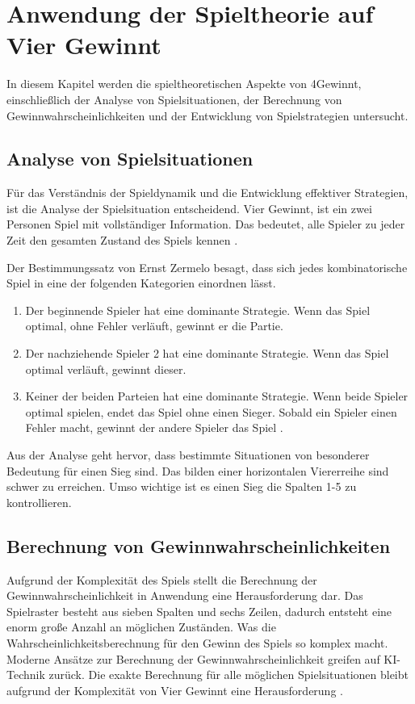 \chapter{Anwendung der Spieltheorie auf Vier Gewinnt}
\label{cha:nwendung der Spieltheorie auf Vier Gewinnt}
In diesem Kapitel werden die spieltheoretischen Aspekte von 4Gewinnt, einschließlich der Analyse von Spielsituationen, der Berechnung von Gewinnwahrscheinlichkeiten und der Entwicklung von Spielstrategien untersucht.


\section{Analyse von Spielsituationen}
\label{sec:Analyse von Spielsituationen}
Für das Verständnis der Spieldynamik und die Entwicklung effektiver Strategien, ist die Analyse der Spielsituation entscheidend.
Vier Gewinnt, ist ein zwei Personen Spiel mit vollständiger Information. Das bedeutet, alle Spieler zu jeder Zeit den gesamten Zustand des Spiels kennen \autocite{ruile2009viergewinnt}.

Der Bestimmungssatz von Ernst Zermelo besagt, dass sich jedes kombinatorische Spiel in eine der folgenden Kategorien einordnen lässt.
\begin{enumerate}
	\item  Der beginnende Spieler hat eine dominante Strategie. Wenn das Spiel optimal, ohne Fehler verläuft, gewinnt er die Partie.
	\item Der nachziehende Spieler 2 hat eine dominante Strategie. Wenn das Spiel optimal verläuft, gewinnt dieser.
	\item Keiner der beiden Parteien hat eine dominante Strategie. Wenn beide Spieler optimal spielen, endet das Spiel ohne einen Sieger. Sobald ein Spieler einen Fehler macht, gewinnt der andere Spieler das Spiel \autocite{mueller_2011}.
\end{enumerate}

Aus der Analyse geht hervor, dass bestimmte Situationen von besonderer Bedeutung für einen Sieg sind.
Das bilden einer horizontalen Viererreihe sind schwer zu erreichen. Umso wichtige ist es einen Sieg die Spalten 1-5 zu kontrollieren. 


\section{Berechnung von Gewinnwahrscheinlichkeiten}
Aufgrund der Komplexität des Spiels stellt die Berechnung der Gewinnwahrscheinlichkeit in Anwendung eine Herausforderung dar. Das Spielraster besteht aus sieben Spalten und sechs Zeilen, dadurch entsteht eine enorm große Anzahl an möglichen Zuständen. Was die Wahrscheinlichkeitsberechnung für den Gewinn des Spiels so komplex macht.
Moderne Ansätze zur Berechnung der Gewinnwahrscheinlichkeit greifen auf KI-Technik zurück. Die exakte Berechnung für alle möglichen Spielsituationen bleibt aufgrund der Komplexität von Vier Gewinnt eine Herausforderung \autocite{ruile2009viergewinnt}.
